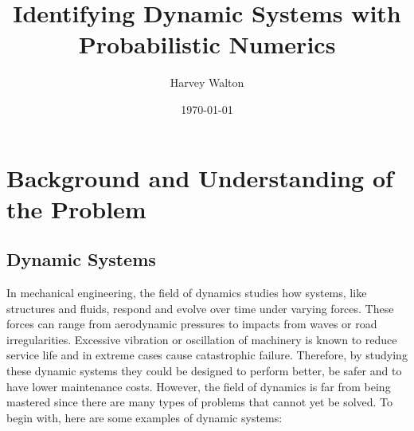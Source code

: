 \documentclass[12pt]{article}
\title{Identifying Dynamic Systems with Probabilistic Numerics}
\author{Harvey Walton}
\date{\today}
\begin{document}

    \thispagestyle{empty}
    

    \printnomenclature

    \newpage
    \tableofcontents
    \newpage


    \section{Background and Understanding of the Problem}

    \subsection{Dynamic Systems}
    In mechanical engineering, the field of dynamics studies how systems, like structures and fluids, respond and evolve over time under varying forces.
    These forces can range from aerodynamic pressures to impacts from waves or road irregularities.
    Excessive vibration or oscillation of machinery is known to reduce service life and in extreme cases cause catastrophic failure.
    Therefore, by studying these dynamic systems they could be designed to perform better, be safer and to have lower maintenance costs.
    However, the field of dynamics is far from being mastered since there are many types of problems that cannot yet be solved.
    To begin with, here are some examples of dynamic systems:
\end{document}
